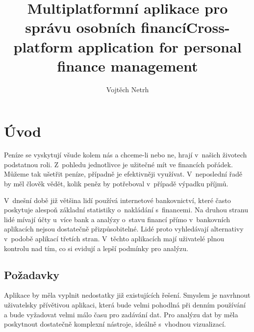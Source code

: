 \documentclass[
  biblatex,
  figures=true,
  tables=false,
  glossaries,
  index
]{kidiplom}
\title{Multiplatformní aplikace pro správu osobních financí}
\title[english]{Cross-platform application for personal finance management}
\author{Vojtěch Netrh}
\begin{document}
\maketitle



\newcommand{\BibLaTeX}{\textsc{Bib}\LaTeX}

\section{Úvod}
Peníze se vyskytují všude kolem nás a chceme-li nebo ne, hrají v~našich životech podstatnou roli. Z~pohledu jednotlivce je užitečné mít ve financích pořádek. Můžeme tak ušetřit peníze, případně je efektivněji využívat. V~neposlední řadě by měl člověk vědět, kolik peněz by potřeboval v~případě výpadku příjmů.

V~dnešní době již většina lidí používá internetové bankovnictví, které často poskytuje alespoň základní statistiky o~nakládání s~financemi. Na druhou stranu lidé mívají účty u~více bank a analýzy o~stavu financí přímo v~bankovních aplikacích nejsou dostatečně přizpůsobitelné. Lidé proto vyhledávají alternativy v~podobě aplikací třetích stran. V~těchto aplikacích mají uživatelé plnou kontrolu nad tím, co si evidují a lepší podmínky pro analýzu.

\subsection{Požadavky}
Aplikace by měla vyplnit nedostatky již existujících řešení. Smyslem je navrhnout uživatelsky přívětivou aplikaci, která bude velmi pohodlná při denním používání a bude vyžadovat velmi málo času pro zadávání dat. Pro analýzu dat by měla poskytnout dostatečně komplexní nástroje, ideálně s~vhodnou vizualizací.
\end{document}
